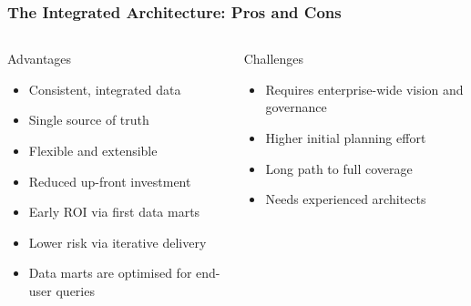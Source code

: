 \begin{frame}
  \frametitle{The Integrated Architecture: Pros and Cons}

  \begin{columns}[T]
    \begin{block}{Advantages}
      \begin{itemize}
        \item Consistent, integrated data
        \item Single source of truth
        \item Flexible and extensible
        \item Reduced up-front investment
        \item Early ROI via first data marts
        \item Lower risk via iterative delivery
        \item Data marts are optimised for end-user queries
      \end{itemize}
    \end{block}

    \begin{alertblock}{Challenges}
      \begin{itemize}
        \item Requires enterprise-wide vision and governance
        \item Higher initial planning effort
        \item Long path to full coverage
        \item Needs experienced architects
      \end{itemize}
    \end{alertblock}
  \end{columns}
\end{frame}


